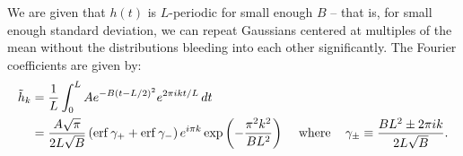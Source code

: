 \documentclass{article}
\theoremstyle{definition}
\renewcommand{\sp}[1]{\;\;\;\text{ #1 }\;\;\;}
\begin{document}
We are given that $h(t)$ is $L$-periodic for small enough $B$ -- that is,
for small enough standard deviation, we can repeat Gaussians
centered at multiples of the mean without the distributions bleeding into
each other significantly. The Fourier coefficients are given by:
\begin{align*}
\tilde h_k &= {1 \over L} \int_0^L A e^{-B (t - L/2)^2}
e^{2\pi i k t / L} \, dt \\
&=
{A\sqrt\pi \over 2L \sqrt B}
\left(
    \erf \gamma_+ + \erf \gamma_-
\right)
e^{i\pi k}
\exp\left(
    -{\pi^2 k^2 \over B L^2}
\right)
\sp{where}
\gamma_{\pm} \equiv {BL^2 \pm 2\pi i k \over 2L \sqrt B}.
\end{align*}
\end{document}
